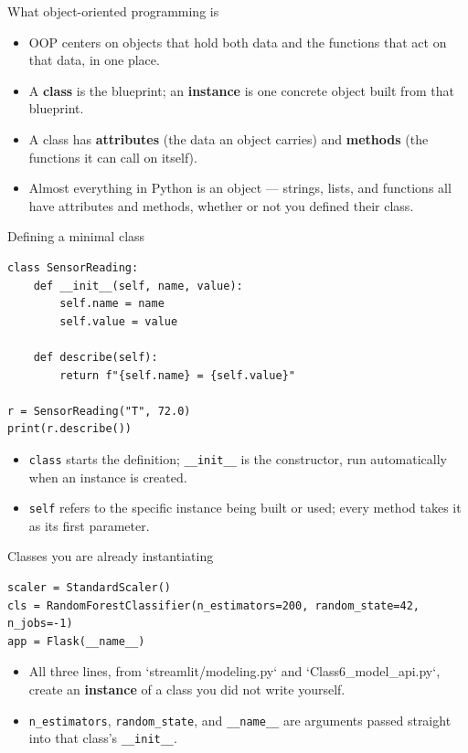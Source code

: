 \begin{frame}{What object-oriented programming is}
\begin{itemize}
\item OOP centers on objects that hold both data and the functions that act on that data, in one place.
\item A \textbf{class} is the blueprint; an \textbf{instance} is one concrete object built from that blueprint.
\item A class has \textbf{attributes} (the data an object carries) and \textbf{methods} (the functions it can call on itself).
\item Almost everything in Python is an object --- strings, lists, and functions all have attributes and methods, whether or not you defined their class.
\end{itemize}
\coursefooter
\end{frame}

\begin{frame}[fragile]{Defining a minimal class}
\begin{lstlisting}[style=coursepython]
class SensorReading:
    def __init__(self, name, value):
        self.name = name
        self.value = value

    def describe(self):
        return f"{self.name} = {self.value}"

r = SensorReading("T", 72.0)
print(r.describe())
\end{lstlisting}
\begin{itemize}
\item \texttt{class} starts the definition; \texttt{\_\_init\_\_} is the constructor, run automatically when an instance is created.
\item \texttt{self} refers to the specific instance being built or used; every method takes it as its first parameter.
\end{itemize}
\coursefooter
\end{frame}

\begin{frame}[fragile]{Classes you are already instantiating}
\begin{lstlisting}[style=coursepython]
scaler = StandardScaler()
cls = RandomForestClassifier(n_estimators=200, random_state=42, n_jobs=-1)
app = Flask(__name__)
\end{lstlisting}
\begin{itemize}
\item All three lines, from `streamlit/modeling.py` and `Class6\_model\_api.py`, create an \textbf{instance} of a class you did not write yourself.
\item \texttt{n\_estimators}, \texttt{random\_state}, and \texttt{\_\_name\_\_} are arguments passed straight into that class's \texttt{\_\_init\_\_}.
\end{itemize}
\coursefooter
\end{frame}

